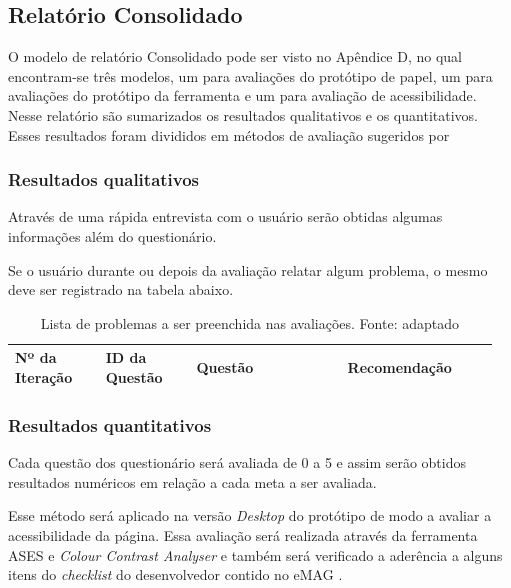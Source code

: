 \subsection{Relatório Consolidado}

O modelo de relatório Consolidado pode ser visto no Apêndice D, no qual encontram-se três modelos,
um para avaliações do protótipo de papel, um para avaliações do protótipo da ferramenta e um para avaliação de acessibilidade. Nesse relatório
são sumarizados os resultados qualitativos e os quantitativos. Esses resultados foram divididos em métodos
de avaliação sugeridos por \cite{BARBOSA}

\subsubsection{Resultados qualitativos}

Através de uma rápida entrevista com o usuário serão obtidas algumas informações além do questionário.


Se o usuário durante ou depois da avaliação relatar algum problema, o mesmo deve ser registrado na tabela abaixo.
\begin{table}[!h]
\caption{Lista de problemas a ser preenchida nas avaliações. Fonte: \cite{preece} adaptado}
\label{tab:problema}
  \begin{tabular}{p{0.18\linewidth}p{0.18\linewidth}p{0.30\linewidth}p{0.30\linewidth}}
  \hline
    Nº da Iteração & ID da Questão & Questão & Recomendação\\
 \hline
  \end{tabular}
\end{table}

\subsubsection{Resultados quantitativos}

  Cada questão dos questionário será avaliada de 0 a 5 e assim serão obtidos resultados numéricos
  em relação a cada meta a ser avaliada.

  
  Esse método será aplicado na versão \textit{Desktop} do protótipo de modo a avaliar a acessibilidade da página.
  Essa avaliação será realizada através da ferramenta ASES e \textit{Colour Contrast Analyser} e também será
  verificado a aderência a alguns itens do \textit{checklist} do desenvolvedor contido no eMAG \cite{emag}.
  
